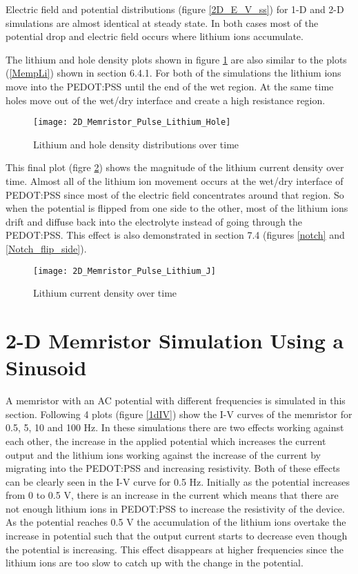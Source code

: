 \begin{doublespace}
Electric field and potential distributions (figure \ref{2D_E_V_ss}) for 1-D and 2-D simulations are almost identical at steady state. In both cases most of the potential drop and electric field occurs where lithium ions accumulate.

The lithium and hole density plots shown in figure \ref{lit_hole_dist} are also similar to the plots (\ref{MempLi}) shown in section 6.4.1. For both of the simulations the lithium ions move into the PEDOT:PSS until the end of the wet region. At the same time holes move out of the wet/dry interface and create a high resistance region.

\begin{figure}[!htp]
\centering
\texttt{[image: 2D\_Memristor\_Pulse\_Lithium\_Hole]}
\caption{Lithium and hole density distributions over time} 
\label{lit_hole_dist}
\end{figure}


This final plot (figre \ref{mag_lit_curr}) shows the magnitude of the lithium current density over time. Almost all of the lithium ion movement occurs at the wet/dry interface of PEDOT:PSS since most of the electric field concentrates around that region. So when the potential is flipped from one side to the other, most of the lithium ions drift and diffuse back into the electrolyte instead of going through the PEDOT:PSS. This effect is also demonstrated in section 7.4 (figures \ref{notch} and \ref{Notch_flip_side}). 

\begin{figure}[!htp]
\centering
\texttt{[image: 2D\_Memristor\_Pulse\_Lithium\_J]}
\caption{Lithium current density over time} 
\label{mag_lit_curr}
\end{figure}


\clearpage
\section{2-D Memristor Simulation Using a Sinusoid}

A memristor with an AC potential with different frequencies is simulated in this section. Following 4 plots (figure \ref{1dIV}) show the I-V curves of the memristor for 0.5, 5, 10 and 100 Hz. In these simulations there are two effects working against each other, the increase in the applied potential which increases the current output and the lithium ions working against the increase of the current by migrating into the PEDOT:PSS and increasing resistivity. Both of these effects can be clearly seen in the I-V curve for 0.5 Hz. Initially as the potential increases from 0 to 0.5 V, there is an increase in the current which means that there are not enough lithium ions in PEDOT:PSS to increase the resistivity of the device. As the potential reaches 0.5 V the accumulation of the lithium ions overtake the increase in potential such that the output current starts to decrease even though the potential is increasing. This effect disappears at higher frequencies since the lithium ions are too slow to catch up with the change in the potential. 
   

\end{doublespace}
